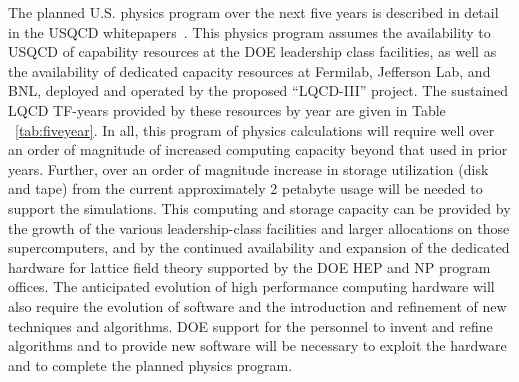 The planned U.S. physics program over the next five years is described in detail
in the USQCD
whitepapers~\cite{USQCD_EF_whitepaper13,USQCD_IF_whitepaper13,USQCD_NP_whitepaper13,USQCD_Thermo_whitepaper13}.
This physics program assumes the availability to USQCD of capability resources
at the DOE leadership class facilities, as well as the availability of dedicated
capacity resources at Fermilab, Jefferson Lab, and BNL, deployed and operated
by the proposed ``LQCD-III'' project.  The sustained LQCD TF-years provided by
these resources by year are given in Table ~\ref{tab:fiveyear}. In all, this
program of physics calculations 
will require well over an order of magnitude of increased computing capacity
beyond that used in prior years.  Further, over an order of magnitude increase
in storage utilization (disk and tape) from the current approximately 2
petabyte usage will be needed to support the simulations.   This computing and
storage capacity can be provided by the growth
of the various leadership-class facilities and larger allocations on those
supercomputers, and by the continued availability and expansion of the
dedicated hardware for lattice field theory supported by the DOE HEP and NP
program offices.  The anticipated evolution of high performance computing
hardware will also require the evolution of software and the introduction and
refinement of new techniques and algorithms.  DOE support for the personnel to
invent and refine algorithms and to provide new software will be necessary to
exploit the hardware and to complete the planned physics program.


